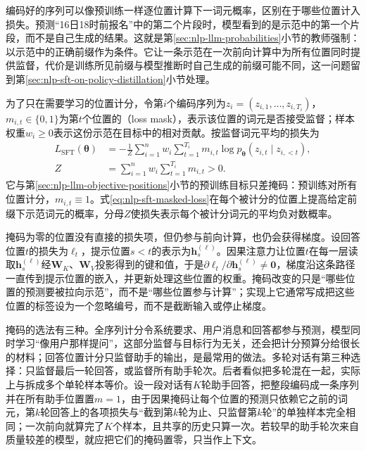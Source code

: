 编码好的序列可以像预训练一样逐位置计算下一词元概率，区别在于哪些位置计入损失。预测“16日18时前报名”中的第二个片段时，模型看到的是示范中的第一个片段，而不是自己生成的结果。这就是第\ref{sec:nlp-llm-probabilities}小节的教师强制：以示范中的正确前缀作为条件。它让一条示范在一次前向计算中为所有位置同时提供监督，代价是训练所见前缀与模型推断时自己生成的前缀可能不同，这一问题留到第\ref{sec:nlp-sft-on-policy-distillation}小节处理。

为了只在需要学习的位置计分，令第$i$个编码序列为$z_i=(z_{i,1},\ldots,z_{i,T_i})$，$m_{i,t}\in\{0,1\}$为第$t$个位置的（loss mask），表示该位置的词元是否接受监督；样本权重$w_i\geq0$表示这份示范在目标中的相对贡献。按监督词元平均的损失为
\begin{equation}
\label{eq:nlp-sft-masked-loss}
\begin{aligned}
 L_{\mathrm{SFT}}(\bm{\theta})
 &=-\frac{1}{Z}\sum_{i=1}^{n}w_i
   \sum_{t=1}^{T_i}m_{i,t}
   \log p_{\bm{\theta}}(z_{i,t}\mid z_{i,<t}),\\
 Z&=\sum_{i=1}^{n}w_i\sum_{t=1}^{T_i}m_{i,t}>0.
\end{aligned}
\end{equation}
它与第\ref{sec:nlp-llm-objective-positions}小节的预训练目标只差掩码：预训练对所有位置计分，$m_{i,t}\equiv1$。式\eqref{eq:nlp-sft-masked-loss}在每个被计分的位置上提高给定前缀下示范词元的概率，分母$Z$使损失表示每个被计分词元的平均负对数概率。

掩码为零的位置没有直接的损失项，但仍参与前向计算，也仍会获得梯度。设回答位置$t$的损失为$\ell_t$，提示位置$s<t$的表示为$\bm h_s^{(\ell)}$。因果注意力让位置$t$在每一层读取$\bm h_s^{(\ell)}$经$\bm W_K$、$\bm W_V$投影得到的键和值，于是$\partial\ell_t/\partial\bm h_s^{(\ell)}\neq\bm 0$，梯度沿这条路径一直传到提示位置的嵌入，并更新处理这些位置的权重。掩码改变的只是“哪些位置的预测要被拉向示范”，而不是“哪些位置参与计算”；实现上它通常写成把这些位置的标签设为一个忽略编号，而不是截断输入或停止梯度。

掩码的选法有三种。全序列计分令系统要求、用户消息和回答都参与预测，模型同时学习“像用户那样提问”，这部分监督与目标行为无关，还会把计分预算分给很长的材料；回答位置计分只监督助手的输出，是最常用的做法。多轮对话有第三种选择：只监督最后一轮回答，或监督所有助手轮次。后者看似把多轮混在一起，实际上与拆成多个单轮样本等价。设一段对话有$K$轮助手回答，把整段编码成一条序列并在所有助手位置置$m=1$，由于因果掩码让每个位置的预测只依赖它之前的词元，第$k$轮回答上的各项损失与“截到第$k$轮为止、只监督第$k$轮”的单独样本完全相同；一次前向就算完了$K$个样本，且共享的历史只算一次。若较早的助手轮次来自质量较差的模型，就应把它们的掩码置零，只当作上下文。

